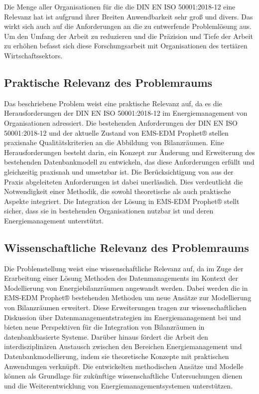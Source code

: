 Die Menge aller Organisationen für die die DIN EN ISO 50001:2018-12 eine Relevanz hat ist aufgrund ihrer Breiten Anwendbarkeit sehr groß und divers. 
Das wirkt sich auch auf die Anforderungen an die zu entwerfende Problemlösung aus. 
Um den Umfang der Arbeit zu reduzieren und die Präzision und Tiefe der Arbeit zu erhöhen befasst sich diese Forschungsarbeit mit Organisationen des tertiären Wirtschaftssektors.

\subsection{Praktische Relevanz des Problemraums} 
Das beschriebene Problem weist eine praktische Relevanz auf, da es die Herausforderungen der DIN EN ISO 50001:2018-12
im Energiemanagement von Organisationen adressiert.
Die bestehenden Anforderungen der DIN EN ISO 50001:2018-12 und der aktuelle Zustand von EMS-EDM Prophet® stellen praxisnahe Qualitätskriterien an die Abbildung von Bilanzräumen.
Eine Herausforderungen besteht darin, ein Konzept zur Änderung und Erweiterung des bestehenden Datenbankmodell zu entwickeln, das diese Anforderungen erfüllt und gleichzeitig praxisnah und umsetzbar ist.
Die Berücksichtigung von aus der Praxis abgeleiteten Anforderungen ist dabei unerlässlich.
Dies verdeutlicht die Notwendigkeit einer Methodik, die sowohl theoretische als auch praktische Aspekte integriert.
Die Integration der Lösung in EMS-EDM Prophet® stellt sicher, dass sie in bestehenden Organisationen nutzbar ist und deren Energiemanagement unterstützt.

\subsection{Wissenschaftliche Relevanz des Problemraums} 
Die Problemstellung weist eine wissenschaftliche Relevanz auf, da im Zuge der Erarbeitung einer Lösung Methoden des Datenmanagements im Kontext der 
Modellierung von Energiebilanzräumen angewandt werden.
Dabei werden die in EMS-EDM Prophet® bestehenden Methoden um neue Ansätze zur Modellierung von Bilanzräumen erweitert.
Diese Erweiterungen tragen zur wissenschaftlichen Diskussion über Datenmanagementstrategien im Energiemanagement bei und bieten neue Perspektiven für die 
Integration von Bilanzräumen in datenbankbasierte Systeme.
Darüber hinaus fördert die Arbeit den interdisziplinären Austausch zwischen den Bereichen Energiemanagement und Datenbankmodellierung, indem sie 
theoretische Konzepte mit praktischen Anwendungen verknüpft.
Die entwickelten methodischen Ansätze und Modelle können als Grundlage für zukünftige wissenschaftliche Untersuchungen dienen und die Weiterentwicklung 
von Energiemanagementsystemen unterstützen.